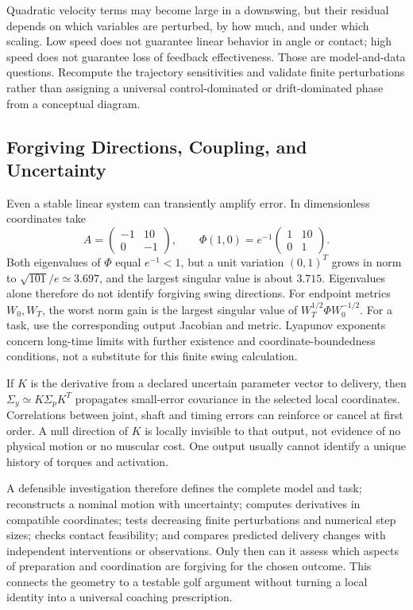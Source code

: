 Quadratic velocity terms may become large in a downswing, but their residual depends on
which variables are perturbed, by how much, and under which scaling. Low speed does not
guarantee linear behavior in angle or contact; high speed does not guarantee loss of
feedback effectiveness. Those are model-and-data questions. Recompute the trajectory
sensitivities and validate finite perturbations rather than assigning a universal
control-dominated or drift-dominated phase from a conceptual diagram.

\subsection{Forgiving Directions, Coupling, and Uncertainty}

Even a stable linear system can transiently amplify error. In dimensionless coordinates take
\[
A=\begin{pmatrix}-1&10\\0&-1\end{pmatrix},\qquad
\Phi(1,0)=e^{-1}\begin{pmatrix}1&10\\0&1\end{pmatrix}.
\]
Both eigenvalues of $\Phi$ equal $e^{-1}<1$, but a unit variation $(0,1)^T$ grows in norm
to $\sqrt{101}/e\simeq3.697$, and the largest singular value is about $3.715$. Eigenvalues
alone therefore do not identify forgiving swing directions. For endpoint metrics $W_0,W_T$,
the worst norm gain is the largest singular value of
$W_T^{1/2}\Phi W_0^{-1/2}$. For a task, use the corresponding output Jacobian and metric.
Lyapunov exponents concern long-time limits with further existence
and coordinate-boundedness conditions, not a substitute for this finite swing calculation.

If $K$ is the derivative from a declared uncertain parameter vector to delivery, then
$\Sigma_y\simeq K\Sigma_pK^T$ propagates small-error covariance in the selected local
coordinates. Correlations between joint, shaft and timing errors can reinforce or cancel
at first order. A null direction of $K$ is locally invisible to that output, not evidence
of no physical motion or no muscular cost. One output usually cannot identify a unique
history of torques and activation.

A defensible investigation therefore defines the complete model and task; reconstructs
a nominal motion with uncertainty; computes derivatives in compatible coordinates;
tests decreasing finite perturbations and numerical step sizes; checks contact feasibility;
and compares predicted delivery changes with independent interventions or observations.
Only then can it assess which aspects of preparation and coordination are forgiving for
the chosen outcome. This connects the geometry to a testable golf argument without
turning a local identity into a universal coaching prescription.

